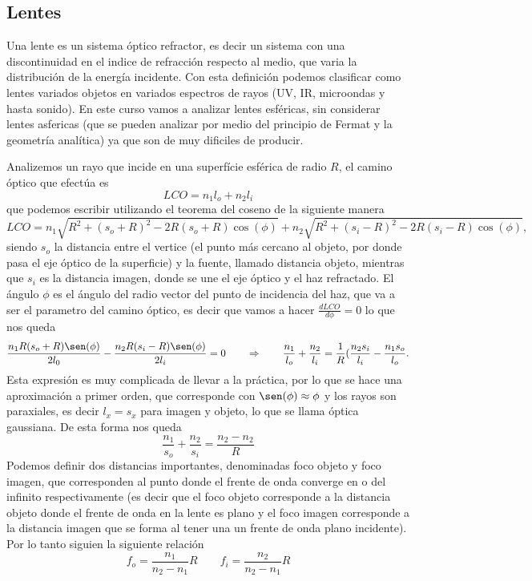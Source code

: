 \documentclass[a4paper]{article}
\numberwithin{equation}{section}
\begin{document}
	\subsection{Lentes}
		Una lente es un sistema óptico refractor, es decir un sistema con una discontinuidad en el indice de refracción respecto al medio, que varia la distribución de la energía incidente. Con esta definición podemos clasificar como lentes variados objetos en variados espectros de rayos (UV, IR, microondas y hasta sonido). En este curso vamos a analizar lentes esféricas, sin considerar lentes asfericas (que se pueden analizar por medio del principio de Fermat y la geometría analítica) ya que son de muy dificiles de producir.
		
		Analizemos un rayo que incide en una superfície esférica de radio $R$, el camino óptico que efectúa es \[LCO = n_1 l_o + n_2 l_i\] que podemos escribir utilizando el teorema del coseno de la siguiente manera \[LCO = n_1\sqrt{R^2 + (s_o + R)^2 - 2 R (s_o + R) \cos(\phi)} + n_2\sqrt{R^2 + (s_i - R)^2 - 2 R (s_i - R) \cos(\phi)},\] siendo $s_o$ la distancia entre el vertice (el punto más cercano al objeto, por donde pasa el eje óptico de la superficie) y la fuente, llamado distancia objeto, mientras que $s_i$ es la distancia imagen, donde se une el eje óptico y el haz refractado. El ángulo $\phi$ es el ángulo del radio vector del punto de incidencia del haz, que va a ser el parametro del camino óptico, es decir que vamos a hacer $\frac{d LCO}{d\phi} = 0$ lo que nos queda 
		\[\frac{n_1 R (s_o + R) \sen(\phi)}{2 l_0} - \frac{n_2 R (s_i - R) \sen(\phi)}{2 l_i} = 0 \qquad \Rightarrow \qquad \frac{n_1}{l_o} + \frac{n_2}{l_i} = \frac{1}{R}(\frac{n_2 s_i}{l_i} - \frac{n_1 s_o}{l_o}.\] 
		Esta expresión es muy complicada de llevar a la práctica, por lo que se hace una aproximación a primer orden, que corresponde con $\sen(\phi) \approx \phi$ y los rayos son paraxiales, es decir $l_x = s_x$ para imagen y objeto, lo que se llama óptica gaussiana. De esta forma nos queda
		\begin{equation}
			\frac{n_1}{s_o} + \frac{n_2}{s_i} = \frac{n_2 - n_2}{R}
			\label{eq:lentes_esferica}
		\end{equation}
		Podemos definir dos distancias importantes, denominadas foco objeto y foco imagen, que corresponden al punto donde el frente de onda converge en o del infinito respectivamente (es decir que el foco objeto corresponde a la distancia objeto donde el frente de onda en la lente es plano y el foco imagen corresponde a la distancia imagen que se forma al tener una un frente de onda plano incidente). Por lo tanto siguien la siguiente relación 
		\begin{equation}
			 f_o = \frac{n_1}{n_2 - n_1} R \qquad f_i = \frac{n_2}{n_2 - n_1} R
			 \label{eq:lentes_foco_objeto_imagen}
		\end{equation}
		
\end{document}
